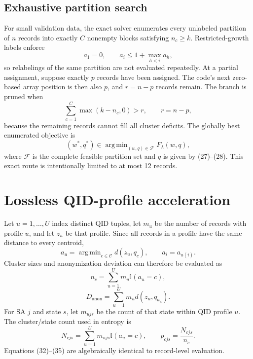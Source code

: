 \documentclass[11pt,a4paper]{article}
\newcommand{\I}{\mathbb{I}}
\DeclareMathOperator*{\argmin}{arg\,min}
\begin{document}
\subsection{Exhaustive partition search}

For small validation data, the exact solver enumerates every unlabeled
partition of $n$ records into exactly $C$ nonempty blocks satisfying
$n_c\ge k$.  Restricted-growth labels enforce
\begin{equation}
a_1=0,
\qquad
a_i\le1+\max_{h<i}a_h,
\tag{29}
\end{equation}
so relabelings of the same partition are not evaluated repeatedly.  At a
partial assignment, suppose exactly $p$ records have been assigned.  The code's
next zero-based array position is then also $p$, and $r=n-p$ records remain.  The
branch is pruned when
\begin{equation}
\sum_{c=1}^{C}\max(k-n_c,0)>r,
\qquad r=n-p,
\tag{30}
\end{equation}
because the remaining records cannot fill all cluster deficits.  The globally
best enumerated objective is
\begin{equation}
(w^*,q^*)\in\argmin_{(w,q)\in\mathcal F}F_\lambda(w,q),
\tag{31}
\end{equation}
where $\mathcal F$ is the complete feasible partition set and $q$ is given by
(27)--(28).  This exact route is intentionally limited to at most 12 records.

\section{Lossless QID-profile acceleration}

Let $u=1,\ldots,U$ index distinct QID tuples, let $m_u$ be the number of
records with profile $u$, and let $z_u$ be that profile.  Since all records in
a profile have the same distance to every centroid,
\begin{equation}
a_u=\argmin_{c\in\mathcal C}d(z_u,q_c),
\qquad a_i=a_{u(i)}.
\tag{32}
\end{equation}
Cluster sizes and anonymization deviation can therefore be evaluated as
\begin{equation}
n_c=\sum_{u=1}^{U}m_u\I(a_u=c),
\tag{33}
\end{equation}
\begin{equation}
D_{\mathrm{anon}}=\sum_{u=1}^{U}m_u d(z_u,q_{a_u}).
\tag{34}
\end{equation}
For SA $j$ and state $s$, let $m_{ujs}$ be the count of that state within QID
profile $u$.  The cluster/state count used in entropy is
\begin{equation}
N_{cjs}=\sum_{u=1}^{U}m_{ujs}\I(a_u=c),
\qquad p_{cjs}=\frac{N_{cjs}}{n_c}.
\tag{35}
\end{equation}
Equations (32)--(35) are algebraically identical to record-level evaluation.
\end{document}
